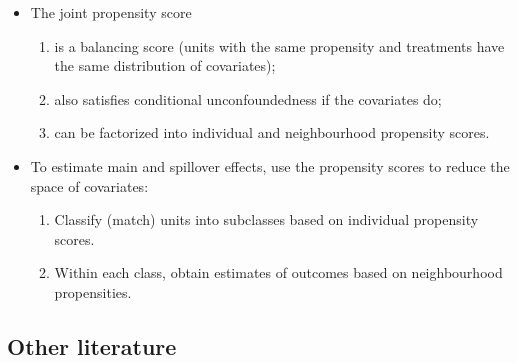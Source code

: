 \documentclass[10pt]{article}
\begin{document}
\begin{itemize}
\item
The joint propensity score
\begin{enumerate}
\item
is a balancing score (units with the same propensity and treatments have the same distribution of covariates);
\item
also satisfies conditional unconfoundedness if the covariates do;
\item
can be factorized into individual and neighbourhood propensity scores.
\end{enumerate}

\item
To estimate main and spillover effects, use the propensity scores to reduce the space of covariates:
\begin{enumerate}
\item
Classify (match) units into subclasses based on individual propensity scores.
\item
Within each class, obtain estimates of outcomes based on neighbourhood propensities.
\end{enumerate}

\end{itemize}

\subsection{Other literature}
\end{document}

